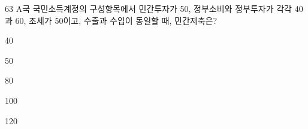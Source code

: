 \begin{question}{63}
A국 국민소득계정의 구성항목에서 민간투자가 50, 정부소비와 정부투자가 각각 40과 60, 조세가 50이고, 수출과 수입이 동일할 때, 민간저축은?
\begin{choices}
  \item 40
  \item 50
  \item 80
  \item 100
  \item 120
\end{choices}
\end{question}
